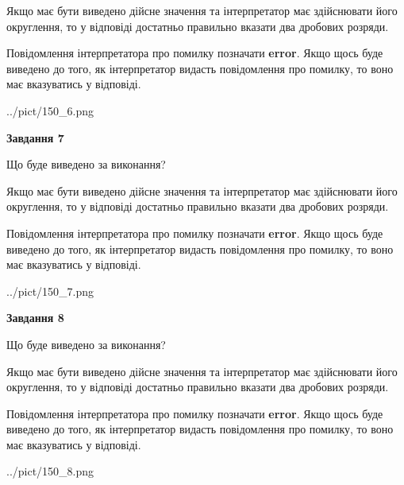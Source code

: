 \documentclass[12pt, ukrainian]{article}
\begin{document}
{\begin {Large}
Якщо має бути виведено дійсне значення та інтерпретатор має здійснювати його округлення, 
то у відповіді достатньо правильно вказати два дробових розряди.

Повідомлення інтерпретатора про помилку позначати \textbf{error}.
Якщо щось буде виведено до того, як інтерпретатор видасть повідомлення про помилку, 
то воно має вказуватись у відповіді. \par

\begin{center}
	{../pict/150_6.png}
\end{center}
\newpage

{\begin {center}\textbf{Завдання 7}\end {center}}\par
Що буде виведено за виконання? \par

Якщо має бути виведено дійсне значення та інтерпретатор має здійснювати його округлення, 
то у відповіді достатньо правильно вказати два дробових розряди.

Повідомлення інтерпретатора про помилку позначати \textbf{error}.
Якщо щось буде виведено до того, як інтерпретатор видасть повідомлення про помилку, 
то воно має вказуватись у відповіді. \par

\begin{center}
	{../pict/150_7.png}
\end{center}
\newpage

{\begin {center}\textbf{Завдання 8}\end {center}}\par
Що буде виведено за виконання? \par

Якщо має бути виведено дійсне значення та інтерпретатор має здійснювати його округлення, 
то у відповіді достатньо правильно вказати два дробових розряди.

Повідомлення інтерпретатора про помилку позначати \textbf{error}.
Якщо щось буде виведено до того, як інтерпретатор видасть повідомлення про помилку, 
то воно має вказуватись у відповіді. \par

\begin{center}
	{../pict/150_8.png}
\end{center}
\newpage


\end{Large}}
\end{document}
